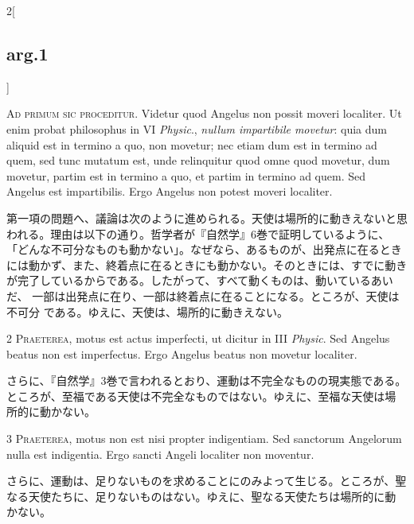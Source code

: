 \documentclass[paper=a4paper,fontsize=10pt,jafontsize=9pt,titlepage]{jlreq}
\begin{document}
\begin{paracol}{2}[\subsection{arg.1}]

{\huge A}{\scshape d primum sic proceditur}. Videtur quod Angelus non
possit moveri localiter. Ut enim probat philosophus in VI {\itshape
Physic}., {\itshape nullum impartibile movetur}: quia dum aliquid est in
termino a quo, non movetur; nec etiam dum est in termino ad quem, sed
tunc mutatum est, unde relinquitur quod omne quod movetur, dum movetur,
partim est in termino a quo, et partim in termino ad quem. Sed Angelus
est impartibilis. Ergo Angelus non potest moveri localiter.

\switchcolumn

第一項の問題へ、議論は次のように進められる。天使は場所的に動きえないと思
 われる。理由は以下の通り。哲学者が『自然学』6巻で証明しているように、
 「どんな不可分なものも動かない」。なぜなら、あるものが、出発点に在るとき
 には動かず、また、終着点に在るときにも動かない。そのときには、すでに動き
 が完了しているからである。したがって、すべて動くものは、動いているあいだ、
 一部は出発点に在り、一部は終着点に在ることになる。ところが、天使は不可分
 である。ゆえに、天使は、場所的に動きえない。

\switchcolumn*

2 {\scshape Praeterea}, motus est actus imperfecti, ut dicitur in III
{\itshape Physic}. Sed Angelus beatus non est imperfectus. Ergo Angelus
beatus non movetur localiter.

\switchcolumn

さらに、『自然学』3巻で言われるとおり、運動は不完全なものの現実態である。
 ところが、至福である天使は不完全なものではない。ゆえに、至福な天使は場
 所的に動かない。

\switchcolumn*

3 {\scshape Praeterea}, motus non est nisi propter
indigentiam. Sed sanctorum Angelorum nulla est indigentia. Ergo sancti
Angeli localiter non moventur.

\switchcolumn

さらに、運動は、足りないものを求めることにのみよって生じる。ところが、聖
 なる天使たちに、足りないものはない。ゆえに、聖なる天使たちは場所的に動
 かない。

\switchcolumn*[\subsection{s.c.}]


\end{paracol}
\end{document}
